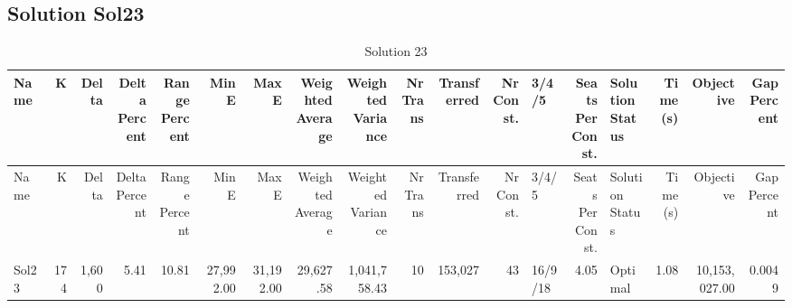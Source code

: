 \documentclass[a4paper]{article}
\begin{document}
\clearpage
\subsection{Solution Sol23}

{\scriptsize
\begin{longtable}{lrrrrrrrrrrrlrlrrr}
\caption{Solution 23}
\\ \toprule
Name &K &Delta &\shortstack{Delta\\Percent} &\shortstack{Range\\Percent} &Min E &Max E &\shortstack{Weighted\\Average} &\shortstack{Weighted\\Variance} &\shortstack{Nr\\Trans} &Transferred &\shortstack{Nr\\Const.} &3/4/5 &\shortstack{Seats\\Per\\Const.} &\shortstack{Solution\\Status} &\shortstack{Time\\(s)} &Objective &\shortstack{Gap\\Percent} \\ \midrule
\endfirsthead
\toprule
Name &K &Delta &\shortstack{Delta\\Percent} &\shortstack{Range\\Percent} &Min E &Max E &\shortstack{Weighted\\Average} &\shortstack{Weighted\\Variance} &\shortstack{Nr\\Trans} &Transferred &\shortstack{Nr\\Const.} &3/4/5 &\shortstack{Seats\\Per\\Const.} &\shortstack{Solution\\Status} &\shortstack{Time\\(s)} &Objective &\shortstack{Gap\\Percent} \\ \midrule
\endhead
\bottomrule
\endfoot
Sol23&174&1,600& 5.41&10.81&27,992.00&31,192.00&29,627.58&1,041,758.43&10&153,027&43&16/9/18& 4.05&Optimal& 1.08&10,153,027.00&0.0049\\ 
\end{longtable}

}
\end{document}
